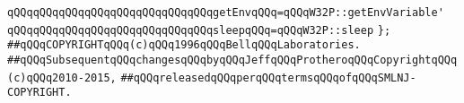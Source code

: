 \newline
\verb|qQQqqQQqqQQqqQQqqQQqqQQqqQQqqQQqgetEnvqQQq=qQQqW32P::getEnvVariable'|\newline
\newline
\verb|qQQqqQQqqQQqqQQqqQQqqQQqqQQqqQQqsleepqQQq=qQQqW32P::sleep|\newline
\verb|};|\newline
\newline
\newline
\verb|##qQQqCOPYRIGHTqQQq(c)qQQq1996qQQqBellqQQqLaboratories.|\newline
\verb|##qQQqSubsequentqQQqchangesqQQqbyqQQqJeffqQQqProtheroqQQqCopyrightqQQq(c)qQQq2010-2015,|\newline
\verb|##qQQqreleasedqQQqperqQQqtermsqQQqofqQQqSMLNJ-COPYRIGHT.|\newline


